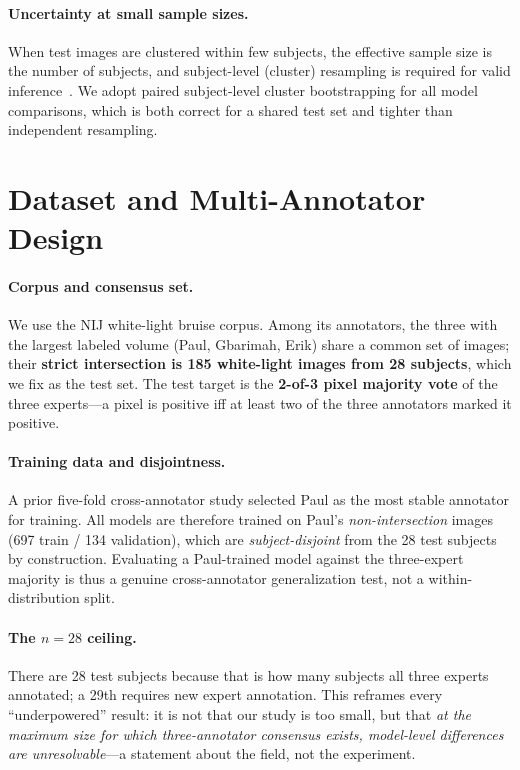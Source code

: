 \documentclass[letterpaper,twocolumn,10pt]{article}
\begin{document}
\paragraph{Uncertainty at small sample sizes.}
When test images are clustered within few subjects, the effective sample size is
the number of subjects, and subject-level (cluster) resampling is required for
valid inference~\cite{clusterboot}. We adopt paired subject-level cluster
bootstrapping for all model comparisons, which is both correct for a shared test
set and tighter than independent resampling.

\section{Dataset and Multi-Annotator Design}
\paragraph{Corpus and consensus set.}
We use the NIJ white-light bruise corpus. Among its annotators, the three with the
largest labeled volume (Paul, Gbarimah, Erik) share a common set of images; their
\textbf{strict intersection is 185 white-light images from 28 subjects}, which we
fix as the test set. The test target is the \textbf{2-of-3 pixel majority vote} of
the three experts---a pixel is positive iff at least two of the three annotators
marked it positive.

\paragraph{Training data and disjointness.}
A prior five-fold cross-annotator study selected Paul as the most stable annotator
for training. All models are therefore trained on Paul's \emph{non-intersection}
images (697 train / 134 validation), which are \emph{subject-disjoint} from the 28
test subjects by construction. Evaluating a Paul-trained model against the
three-expert majority is thus a genuine cross-annotator generalization test, not a
within-distribution split.

\paragraph{The $n=28$ ceiling.}
There are 28 test subjects because that is how many subjects all three experts
annotated; a 29th requires new expert annotation. This reframes every
``underpowered'' result: it is not that our study is too small, but that
\emph{at the maximum size for which three-annotator consensus exists,
model-level differences are unresolvable}---a statement about the field, not the
experiment.
\end{document}
